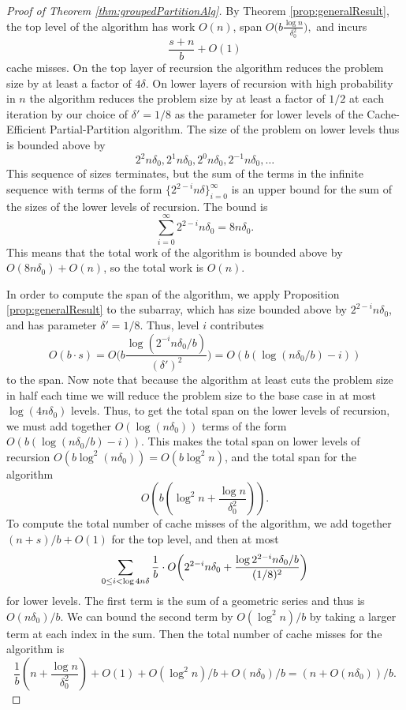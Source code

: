 \documentclass[sigconf]{acmart}
\DeclarePairedDelimiter{\paren}{(}{)}
\theoremstyle{remark}
\theoremstyle{remark}
\begin{document}
\begin{proof}[Proof of Theorem \ref{thm:groupedPartitionAlg}]
	By Theorem \ref{prop:generalResult}, the top level of the algorithm has work $O(n)$, span $O\Big(b\frac{\log n}{\delta_0^2}\Big),$
	and incurs $$\frac{s+n}{b} + O(1)$$ cache misses.  
	On the top layer of recursion the algorithm reduces the problem size by at least a factor of $4\delta$. 
	On lower layers of recursion with high probability in $n$ the algorithm reduces the problem size by at least a factor of $1/2$ at each iteration by our choice of $\delta'=1/8$ as the parameter for lower levels of the Cache-Efficient Partial-Partition algorithm.
	The size of the problem on lower levels thus is bounded above by
	$$2^2n\delta_0, 2^1n\delta_0,2^0n\delta_0, 2^{-1}n\delta_0, \ldots$$
	This sequence of sizes terminates, but the sum of the terms in the infinite sequence with terms of the form $\{2^{2-i}n\delta\}_{i=0}^{\infty}$ is an upper bound for the sum of the sizes of the lower levels of recursion. 
	 The bound is
	 $$\sum_{i=0}^{\infty}2^{2-i}n\delta_0 = 8n\delta_0.$$
	This means that the total work of the algorithm is bounded above by $O(8n\delta_0) + O(n)$, so the total work is $O(n)$.
	
	In order to compute the span of the algorithm, we apply Proposition \ref{prop:generalResult} to the subarray, which has size bounded above by $2^{2-i}n\delta_0$, and has parameter $\delta'=1/8$. 
	Thus, level $i$ contributes
	$$O(b\cdot s)=O\Big(b\frac{\log(2^{-i}n\delta_0/b)}{(\delta')^2}\Big)=O(b(\log(n\delta_0/b)-i))$$ to the span.
	Now note that because the algorithm at least cuts the problem size in half each time we will reduce the problem size to the base case in at most $\log (4n\delta_0)$ levels.
	Thus, to get the total span on the lower levels of recursion, we must add together $O(\log(n\delta_0))$ terms of the form $O(b(\log (n\delta_0/b) - i))$.
	This makes the total span on lower levels of recursion $O(b\log^2 (n\delta_0))=O(b\log^2 n)$, and the total span for the algorithm 
	$$O\left(b\left(\log^2 n + \frac{\log n}{\delta_0^2}\right)\right).$$
	To compute the total number of cache misses of the algorithm, we add together $(n+s)/b+O(1)$ for the top level, and then at most
	$$\sum_{0 \leq i<\log 4n\delta}\frac{1}{b}\cdot O\paren*{2^{2-i}n\delta_0 + \frac{\log 2^{2-i}n\delta_0/b}{(1/8)^2}}$$
	for lower levels.
	The first term is the sum of a geometric series and thus is $O(n\delta_0)/b$. 
	We can bound the second term by $O(\log^2 n)/b$ by taking a larger term at each index in the sum. 
	Then the total number of cache misses for the algorithm is 
	$$\frac{1}{b}\left(n+\frac{\log n}{\delta_0^2 }\right) + O(1) + O(\log^2 n) / b + O(n\delta_0) / b = (n+O(n\delta_0))/b.$$
\end{proof}
\end{document}
